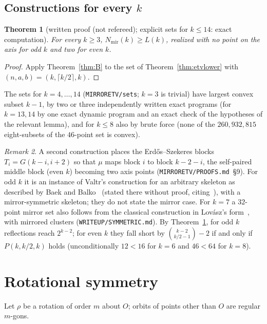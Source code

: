\documentclass[10pt]{article}
\newtheorem{theorem}{Theorem}[section]
\theoremstyle{definition}
\theoremstyle{remark}
\newtheorem{remark}[theorem]{Remark}
\newcommand{\Nm}{N_{\mathrm{mir}}}
\newcommand{\dirn}[1]{{\upshape\nolinkurl{#1}}}
\begin{document}
\subsection{Constructions for every \texorpdfstring{$k$}{k}}

\begin{theorem}[written proof (not refereed); explicit sets for $k\le14$: exact computation]\label{thm:allk}
For every $k\ge3$, $\Nm(k)\ge L(k)$, realized with no point on the axis for odd $k$ and two for even $k$.
\end{theorem}

\begin{proof}
Apply Theorem~\ref{thm:B} to the set of Theorem~\ref{thm:etvlower} with $(n,a,b)=(k,\lceil k/2\rceil,k)$.
\end{proof}

The sets for $k=4,\dots,14$ (\dirn{MIRRORETV/sets}; $k=3$ is trivial) have largest convex subset $k-1$, by two or three independently
written exact programs (for $k=13,14$ by one exact dynamic program and an exact check of the hypotheses of the relevant
lemma), and for $k\le8$ also by brute force (none of the $260{,}932{,}815$ eight-subsets of the $46$-point set is
convex).

\begin{remark}\label{rem:mirrorcredit}
A second construction places the Erd\H{o}s--Szekeres blocks $T_i=G(k-i,i+2)$ so that $\mu$ maps block $i$ to block
$k-2-i$, the self-paired middle block (even $k$) becoming two axis points (\dirn{MIRRORETV/PROOFS.md}~\S9). For odd $k$
it is an instance of Valtr's construction for an arbitrary skeleton as described by Baek and Balko~\cite[\S4]{BB25}
(stated there without proof, citing~\cite{ES61,ETV96}), with a mirror-symmetric skeleton; they do not state the mirror
case. For $k=7$ a $32$-point mirror set also follows from the classical construction in Lov\'asz's form~\cite[Thm.~2.6]{MS00},
with mirrored clusters (\dirn{WRITEUP/SYMMETRIC.md}). By Theorem~\ref{thm:allk}, for odd $k$ reflections reach $2^{k-2}$; for even $k$ they fall short by
$\binom{k-2}{k/2-1}-2$ if and only if $P(k,k/2,k)$ holds (unconditionally $12<16$ for $k=6$ and $46<64$ for $k=8$).
\end{remark}

\section{Rotational symmetry}\label{sec:rot}

Let $\rho$ be a rotation of order $m$ about $O$; orbits of points other than $O$ are regular $m$-gons.
\end{document}

